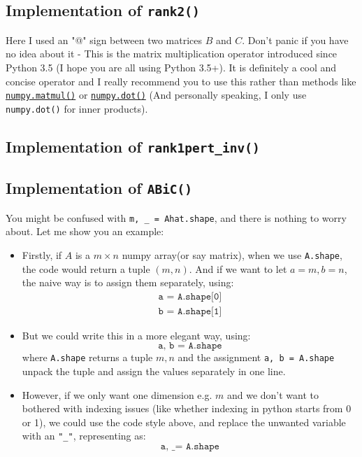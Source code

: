 \subsection{Implementation of \texttt{rank2()}}

Here I used an "@" sign between two matrices \(B\) and \(C\). Don't panic if you have no idea about it - This is the matrix multiplication operator introduced since Python 3.5 (I hope you are all using Python 3.5+). It is definitely a cool and concise operator and I really recommend you to use this rather than methods like \href{https://numpy.org/doc/stable/reference/generated/numpy.matmul.html}{\texttt{numpy.matmul()}} or \href{https://numpy.org/doc/stable/reference/generated/numpy.dot.html}{\texttt{numpy.dot()}} (And personally speaking, I only use \texttt{numpy.dot()} for inner products).
\newpage
\subsection{Implementation of \texttt{rank1pert\_inv()}}

\subsection{Implementation of \texttt{ABiC()}}

You might be confused with \texttt{m, \_ = Ahat.shape}, and there is nothing to worry about. Let me show you an example:
\begin{itemize}
    \item Firstly, if \(A\) is a \(m \times  n\) numpy array(or say matrix), when we use \texttt{A.shape}, the code would return a tuple \((m, n)\). And if we want to let \(a = m, b = n\), the naive way is to assign them separately, using:
    \[
    \begin{array}{c}
        \texttt{a = A.shape[0]} \\
        \texttt{b = A.shape[1]}
    \end{array}
    \]
    \item But we could write this in a more elegant way, using:
    \[
        \texttt{a, b = A.shape}
    \]
    where \texttt{A.shape} returns a tuple \(m, n\) and the assignment \texttt{a, b = A.shape} unpack the tuple and assign the values separately in one line.
    \item However, if we only want one dimension e.g. \(m\) and we don't want to bothered with indexing issues (like whether indexing in python starts from 0 or 1), we could use the code style above, and replace the unwanted variable with an \texttt{"\_"}, representing as:
    \[
        \texttt{a, \_ = A.shape}
    \]
\end{itemize}

